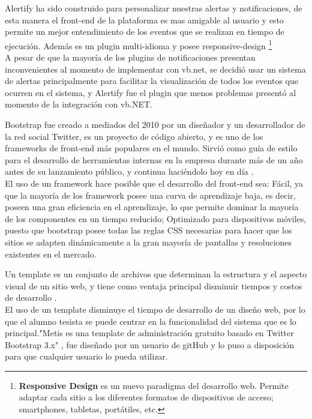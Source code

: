 Alertify ha sido construido para personalizar nuestras alertas y notificaciones, de esta manera el front-end de la plataforma es mas amigable al usuario y esto permite un mejor entendimiento de los eventos que se realizan en tiempo de ejecución. Además es un plugin multi-idioma y posee responsive-design \footnote{ \textbf{ Responsive Design} es un nuevo paradigma del desarrollo web. Permite adaptar cada sitio a los diferentes formatos de dispositivos de acceso; smartphones, tabletas, portátiles, etc.}
\\

A pesar de que la mayoría de los plugins de notificaciones presentan inconvenientes al momento de implementar con vb.net, se decidió usar un sistema de alertas principalmente para facilitar la visualización de todos los eventos que ocurren en el sistema, y Alertify fue el plugin que menos problemas presentó al momento de la integración con vb.NET.



Bootstrap fue creado a mediados del 2010 por un diseñador y un desarrollador de la red social Twitter, es un proyecto de código abierto, y es uno de los frameworks de front-end más populares en el mundo. Sirvió como guía de estilo para el desarrollo de herramientas internas en la empresa durante más de un año antes de su lanzamiento público, y continua haciéndolo hoy en día \cite{boo15}.
\\

El uso de un framework hace posible que el desarrollo del front-end sea: Fácil, ya que la mayoría de los framework posee una curva de aprendizaje baja, es decir, poseen una gran eficiencia en el  aprendizaje, lo que permite dominar la mayoría de los componentes en un tiempo reducido; Optimizado para dispositivos móviles, puesto que bootstrap posee todas las reglas CSS necesarias para hacer que los sitios se  adapten dinámicamente a la gran mayoría de pantallas y resoluciones existentes en el mercado.



Un template es un conjunto de archivos que determinan la estructura y el aspecto visual de un sitio web, y tiene como ventaja principal disminuir tiempos y costos de desarrollo \cite{gli15}. 
\\

El uso de un template disminuye el tiempo de desarrollo de un diseño web, por lo que el alumno tesista se puede centrar en la funcionalidad del sistema que es lo principal."Metis es una  template de administración gratuito basado en Twitter Bootstrap 3.x"\hspace{0.2cm} \cite{git15}, fue diseñado por un usuario de gitHub y lo puso a disposición para que cualquier usuario lo pueda utilizar.

